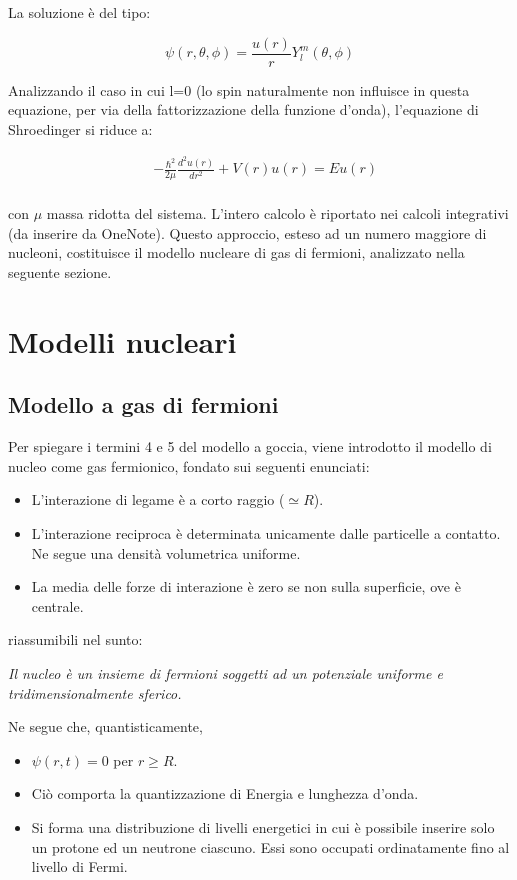 \documentclass{article}
\begin{document}
La soluzione è del tipo:

\begin{equation}
    \psi(r, \theta, \phi)=\frac{u(r)}{r}Y^m_l(\theta, \phi)
\end{equation}

Analizzando il caso in cui l=0 (lo spin naturalmente non influisce in questa equazione, per via della fattorizzazione della funzione d'onda),
l'equazione di Shroedinger si riduce a:

\begin{equation}
    \begin{aligned}
         & -\frac{\hbar^2}{2\mu}\frac{d^2u(r)}{dr^2}+V(r)u(r)=Eu(r) \\
    \end{aligned}
\end{equation}

con $\mu$ massa ridotta del sistema.
L'intero calcolo è riportato nei calcoli integrativi (da inserire da OneNote).
Questo approccio, esteso ad un numero maggiore di nucleoni, costituisce il modello nucleare di gas di fermioni, analizzato nella seguente sezione.


\section{Modelli nucleari}
\subsection{Modello a gas di fermioni}
Per spiegare i termini 4 e 5 del modello a goccia, viene introdotto il modello di nucleo come gas fermionico,
fondato sui seguenti enunciati:
\begin{itemize}
    \item L'interazione di legame è a corto raggio ($\simeq R$).
    \item L'interazione reciproca è determinata unicamente dalle particelle a contatto. Ne segue una densità volumetrica uniforme.
    \item La media delle forze di interazione è zero se non sulla superficie, ove è centrale.
\end{itemize}

riassumibili nel sunto:

\emph{Il nucleo è un insieme di fermioni soggetti ad un potenziale uniforme e tridimensionalmente sferico.}

Ne segue che, quantisticamente,

\begin{itemize}
    \item $\psi(r, t)=0$ per $r\geq R$.
    \item Ciò comporta la quantizzazione di Energia e lunghezza d'onda.
    \item Si forma una distribuzione di livelli energetici in cui è possibile inserire solo un protone ed un neutrone ciascuno. Essi sono
          occupati ordinatamente fino al livello di Fermi.
\end{itemize}
\end{document}

